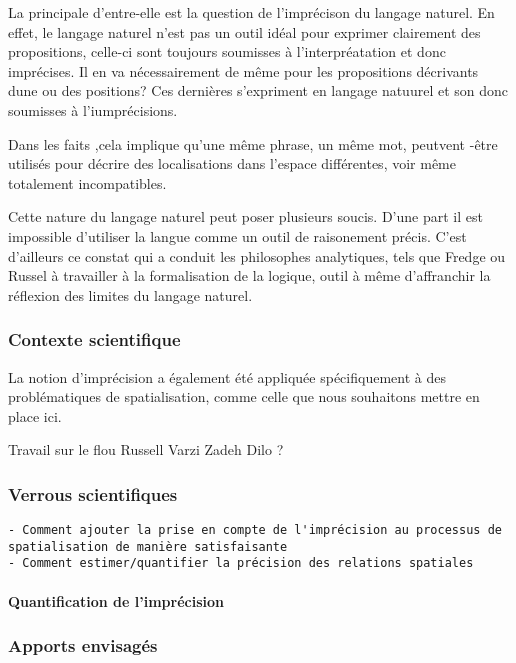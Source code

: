 La principale d'entre-elle est la question de l'imprécison du langage
naturel. En effet, le langage naturel n'est pas un outil idéal pour
exprimer clairement des propositions, celle-ci sont toujours
soumisses à l'interpréatation et donc imprécises. Il en va
nécessairement de même pour les propositions décrivants dune ou des
positions? Ces dernières s'expriment en langage natuurel et son donc
soumisses à l'iumprécisions.

Dans les faits ,cela implique qu'une même phrase, un même mot,
peutvent -être utilisés pour décrire des localisations dans l'espace
différentes, voir même totalement incompatibles.

Cette nature du langage naturel peut poser plusieurs soucis. D'une
part il est impossible d'utiliser la langue comme un outil de
raisonement précis. C'est d'ailleurs ce constat qui a conduit les
philosophes analytiques, tels que Fredge ou Russel à travailler à la
formalisation de la logique, outil à même d'affranchir la réflexion
des limites du langage naturel.



\subsubsection{Contexte scientifique}

La notion d'imprécision a également été appliquée spécifiquement à des
problématiques de spatialisation, comme celle que nous souhaitons
mettre en place ici.



Travail sur le flou
Russell
Varzi
Zadeh
Dilo ?


\subsubsection{Verrous scientifiques}

\begin{verbatim}
- Comment ajouter la prise en compte de l'imprécision au processus de
spatialisation de manière satisfaisante
- Comment estimer/quantifier la précision des relations spatiales
\end{verbatim}

\paragraph{Quantification de l'imprécision}

\subsubsection{Apports envisagés}

